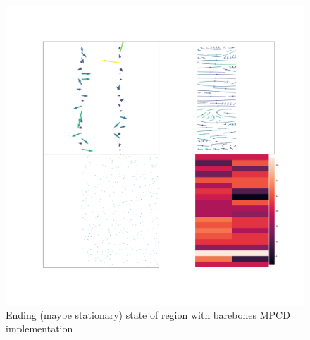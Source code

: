 \documentclass[
]{article}
\begin{document}
\begin{figure}
\centering
\includegraphics{Assets/stationary_region.png}
\caption{Ending (maybe stationary) state of region with barebones MPCD
implementation}
\end{figure}
\end{document}
